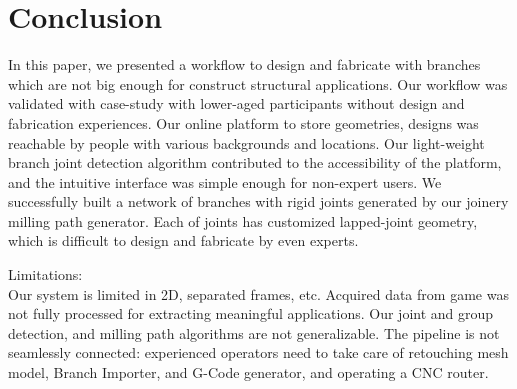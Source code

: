 \section{Conclusion}
In this paper, we presented a workflow to design and fabricate with branches which are not big enough for construct structural applications.
Our workflow was validated with case-study with lower-aged participants without design and fabrication experiences.
Our online platform to store geometries, designs was reachable by people with various backgrounds and locations.
Our light-weight branch joint detection algorithm contributed to the accessibility of the platform, and the intuitive interface was simple enough for non-expert users.
We successfully built a network of branches with rigid joints generated by our joinery milling path generator.
Each of joints has customized lapped-joint geometry, which is difficult to design and fabricate by even experts.

Limitations: \\
Our system is limited in 2D, separated frames, etc.
Acquired data from game was not fully processed for extracting meaningful applications.
Our joint and group detection, and milling path algorithms are not generalizable.
The pipeline is not seamlessly connected: experienced operators need to take care of retouching mesh model, Branch Importer, and G-Code generator, and operating a CNC router.

